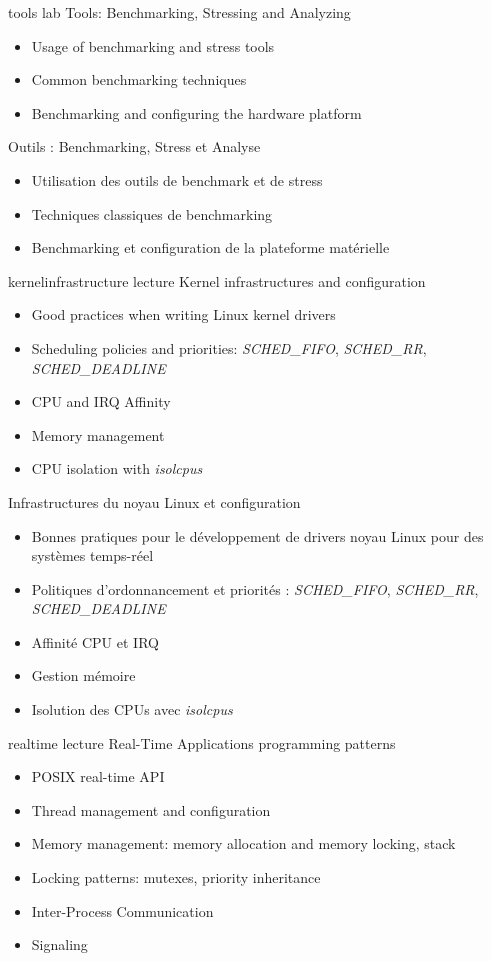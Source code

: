 {tools}
{lab}
{Tools: Benchmarking, Stressing and Analyzing}
{
  \begin{itemize}
  \item Usage of benchmarking and stress tools
  \item Common benchmarking techniques
  \item Benchmarking and configuring the hardware platform
  \end{itemize}
}
{Outils : Benchmarking, Stress et Analyse}
{
  \begin{itemize}
  \item Utilisation des outils de benchmark et de stress
  \item Techniques classiques de benchmarking
  \item Benchmarking et configuration de la plateforme matérielle
  \end{itemize}
}
{kernelinfrastructure}
{lecture}
{Kernel infrastructures and configuration}
{
  \begin{itemize}
  \item Good practices when writing Linux kernel drivers
  \item Scheduling policies and priorities: {\em SCHED\_FIFO}, {\em
      SCHED\_RR}, {\em SCHED\_DEADLINE}
  \item CPU and IRQ Affinity
  \item Memory management
  \item CPU isolation with {\em isolcpus}
  \end{itemize}
}
{Infrastructures du noyau Linux et configuration}
{
  \begin{itemize}
  \item Bonnes pratiques pour le développement de drivers noyau Linux
    pour des systèmes temps-réel
  \item Politiques d'ordonnancement et priorités : {\em SCHED\_FIFO},
    {\em SCHED\_RR}, {\em SCHED\_DEADLINE}
  \item Affinité CPU et IRQ
  \item Gestion mémoire
  \item Isolution des CPUs avec {\em isolcpus}
  \end{itemize}
}
{realtime}
{lecture}
{Real-Time Applications programming patterns}
{
  \begin{itemize}
  \item POSIX real-time API
  \item Thread management and configuration
  \item Memory management: memory allocation and memory locking, stack
  \item Locking patterns: mutexes, priority inheritance
  \item Inter-Process Communication
  \item Signaling
  \end{itemize}
}
